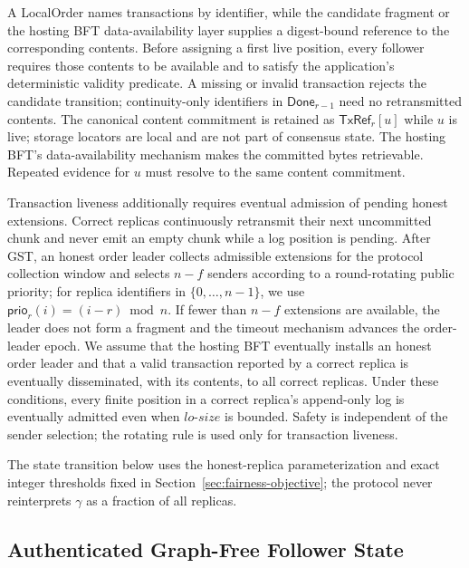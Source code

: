 A LocalOrder names transactions by identifier, while the candidate fragment
or the hosting BFT data-availability layer supplies a digest-bound reference to
the corresponding contents.  Before assigning a first live position, every
follower requires those contents to be available and to satisfy the
application's deterministic validity predicate.  A missing or invalid
transaction rejects the candidate transition; continuity-only identifiers in
$\mathsf{Done}_{r-1}$ need no retransmitted contents.  The canonical content
commitment is retained as $\mathsf{TxRef}_r[u]$ while $u$ is live; storage
locators are local and are not part of consensus state.  The hosting BFT's
data-availability mechanism makes the committed bytes retrievable.  Repeated
evidence for $u$ must resolve to the same content commitment.

Transaction liveness additionally requires eventual admission of pending
honest extensions.  Correct replicas continuously retransmit their next
uncommitted chunk and never emit an empty chunk while a log position is
pending.  After GST, an honest order leader collects admissible extensions for
the protocol collection window and selects $n-f$ senders according to a
round-rotating public priority; for replica identifiers in
$\{0,\ldots,n-1\}$, we use
$\mathsf{prio}_r(i)=(i-r)\bmod n$.  If fewer than $n-f$ extensions are
available, the leader does not form a fragment and the timeout mechanism
advances the order-leader epoch.  We assume that the hosting BFT eventually
installs an honest order leader and that a valid transaction reported by a
correct replica is eventually disseminated, with its contents, to all correct
replicas.  Under these conditions, every finite position in a correct
replica's append-only log is eventually admitted even when $lo\text{-}size$
is bounded.  Safety is independent of the sender selection; the rotating rule
is used only for transaction liveness.

The state transition below uses the honest-replica parameterization and exact
integer thresholds fixed in Section~\ref{sec:fairness-objective}; the
protocol never reinterprets $\gamma$ as a fraction of all replicas.

\subsection{Authenticated Graph-Free Follower State}
\label{sec:authenticated-evidence-state}

